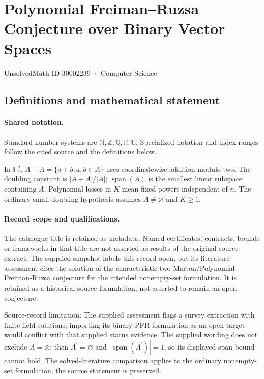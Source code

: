 \documentclass[11pt]{article}
\begin{document}
\setcounter{section}{30002238}
\section{Polynomial Freiman–Ruzsa Conjecture over Binary Vector Spaces}\label{30002239}
{\small\sffamily UnsolvedMath ID 30002239 · Computer Science}
\subsection{Definitions and mathematical statement}

\paragraph{Shared notation.}Standard number systems are $\mathbb N,\mathbb Z,\mathbb Q,\mathbb R,\mathbb C$. Specialized notation and index ranges follow the cited source and the definitions below.


In $\mathbb F_2^n$, $A+A=\{a+b:a,b\in A\}$ uses coordinatewise addition modulo two. The doubling constant is $|A+A|/|A|$; $\operatorname{span}(A)$ is the smallest linear subspace containing $A$. Polynomial losses in $K$ mean fixed powers independent of $n$. The ordinary small-doubling hypothesis assumes $A\ne\varnothing$ and $K\ge1$.
\paragraph{Record scope and qualifications.}
The catalogue title is retained as metadata. Named certificates, contracts, bounds or frameworks in that title are not asserted as results of the original source extract.
The supplied snapshot labels this record open, but its literature assessment cites the solution of the characteristic-two Marton/Polynomial Freiman-Ruzsa conjecture for the intended nonempty-set formulation. It is retained as a historical source formulation, not asserted to remain an open conjecture.

Source-record limitation: The supplied assessment flags a survey extraction with finite-field solutions; importing its binary PFR formulation as an open target would conflict with that supplied status evidence. The supplied wording does not exclude $A=\varnothing$: then $A^{\prime}=\varnothing$ and $|\operatorname{span}(A^{\prime})|=1$, so its displayed span bound cannot hold. The solved-literature comparison applies to the ordinary nonempty-set formulation; the source statement is preserved.
\end{document}
